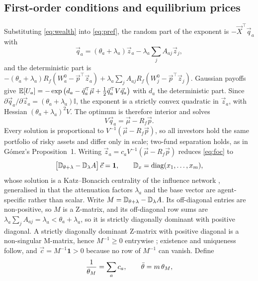 \subsection{First-order conditions and equilibrium prices}

Substituting \eqref{eq:wealth} into \eqref{eq:pref}, the random part of the
exponent is $-\vec X^{\top}\vec q_a$ with
%
\begin{equation}
\vec q_a=(\theta_a+\lambda_a)\vec z_a-\lambda_a\sum_jA_{aj}\vec z_j ,
\label{eq:qa}
\end{equation}
%
and the deterministic part is
$-(\theta_a+\lambda_a)R_f(W_a^0-\vec p^{\top}\vec z_a)
+\lambda_a\sum_jA_{aj}R_f(W_j^0-\vec p^{\top}\vec z_j)$. Gaussian payoffs give
$\mathbb{E}[U_a]=-\exp\big(d_a-\vec q_a^{\top}\vec\mu+\tfrac12\vec q_a^{\top}V\vec q_a\big)$
with $d_a$ the deterministic part. Since
$\partial\vec q_a/\partial\vec z_a=(\theta_a+\lambda_a)\mathbb{I}$, the exponent
is a strictly convex quadratic in $\vec z_a$, with Hessian
$(\theta_a+\lambda_a)^{2}V$. The optimum is therefore interior and solves
%
\begin{equation}
V\vec q_a=\vec\mu-R_f\vec p .
\label{eq:foc}
\end{equation}
%
Every solution is proportional to $V^{-1}(\vec\mu-R_f\vec p)$, so all investors
hold the same portfolio of risky assets and differ only in scale; two-fund
separation holds, as in Gómez's Proposition~1. Writing
$\vec z_a=c_aV^{-1}(\vec\mu-R_f\vec p)$ reduces \eqref{eq:foc} to
%
\begin{equation}
\big[\mathbb{D}_{\theta+\lambda}-\mathbb{D}_{\lambda}A\big]\,\vec c=\mathbf 1,
\qquad \mathbb{D}_x=\mathrm{diag}(x_1,\dots,x_m),
\label{eq:system}
\end{equation}
%
whose solution is a Katz--Bonacich centrality of the influence network
\cite{ballester}, generalised in that the attenuation factors $\lambda_a$ and
the base vector are agent-specific rather than scalar. Write
$M=\mathbb{D}_{\theta+\lambda}-\mathbb{D}_{\lambda}A$. Its off-diagonal entries are
non-positive, so $M$ is a Z-matrix, and its off-diagonal row sums are
$\lambda_a\sum_jA_{aj}=\lambda_a<\theta_a+\lambda_a$, so it is strictly
diagonally dominant with positive diagonal. A strictly diagonally dominant
Z-matrix with positive diagonal is a non-singular M-matrix, hence $M^{-1}\geq0$
entrywise \cite{bermanplemmons}; existence and uniqueness follow, and
$\vec c=M^{-1}\mathbf 1>0$ because no row of $M^{-1}$ can vanish. Define
%
\begin{equation}
\frac{1}{\theta_M}=\sum_ac_a,
\qquad \bar\theta=m\,\theta_M ,
\label{eq:thm}
\end{equation}
